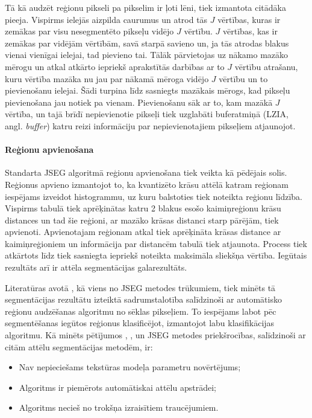 \documentclass[12pt,paper=a4]{report}
\begin{document}
Tā kā audzēt reģionu pikseli pa pikselim ir ļoti lēni, tiek izmantota citādāka pieeja. Vispirms ielejās aizpilda caurumus un atrod tās $J$ vērtības, kuras ir zemākas par visu nesegmentēto pikseļu vidējo $J$ vērtību. $J$ vērtības, kas ir zemākas par vidējām vērtībām, savā starpā savieno un, ja tās atrodas blakus vienai vienīgai ielejai, tad pievieno tai. Tālāk pārvietojas uz nākamo mazāko mērogu un atkal atkārto iepriekš aprakstītās darbības ar to $J$ vērtību atrašanu, kuru vērtība mazāka nu jau par nākamā mēroga vidējo $J$ vērtību un to pievienošanu ielejai. Šādi turpina līdz sasniegts mazākais mērogs, kad pikseļu pievienošana jau notiek pa vienam. Pievienošanu sāk ar to, kam mazākā $J$ vērtība, un tajā brīdī nepievienotie pikseļi tiek uzglabāti buferatmiņā (LZIA, angl. \textit{buffer}) katru reizi informāciju par nepievienotajiem pikseļiem atjaunojot. \cite{1colImSegm1999}\par
\paragraph{Reģionu apvienošana}Standarta JSEG algoritmā reģionu apvienošana tiek veikta kā pēdējais solis. Reģionus apvieno izmantojot to, ka kvantizēto krāsu attēlā katram reģionam iespējams izveidot histogrammu, uz kuru balstoties tiek noteikta reģionu līdzība. Vispirms tabulā tiek aprēķinātas katru 2 blakus esošo kaimiņreģionu krāsu distances un tad šie reģioni, ar mazāko krāsas distanci starp pārējām, tiek apvienoti. Apvienotajam reģionam atkal tiek aprēķināta krāsas distance ar kaimiņreģioniem un informācija par distancēm tabulā tiek atjaunota. Process tiek atkārtots līdz tiek sasniegta iepriekš noteikta maksimāla sliekšņa vērtība. Iegūtais rezultāts arī ir attēla segmentācijas galarezultāts.\cite{1colImSegm1999}\par 
Literatūras avotā \cite{3seededRegGrow2005}, kā viens no JSEG metodes trūkumiem, tiek minēts tā segmentācijas rezultātu izteiktā sadrumstalotība salīdzinoši ar automātisko reģionu audzēšanas algoritmu no sēklas pikseļiem. To iespējams labot pēc segmentēšanas iegūtos reģionus klasificējot, izmantojot labu klasifikācijas algoritmu. Kā minēts pētījumos \cite{1colImSegm1999}, \cite{2unsupImSegm2001}, \cite{6buildings2008} un \cite{5forest2007} JSEG metodes priekšrocības, salīdzinoši ar citām attēlu segmentācijas metodēm, ir:
\begin{itemize}
\item Nav nepieciešams tekstūras modeļa parametru novērtējums;
\item Algoritms ir piemērots automātiskai attēlu apstrādei;
\item Algoritms necieš no trokšņa izraisītiem traucējumiem.
\end{itemize}
\end{document}
